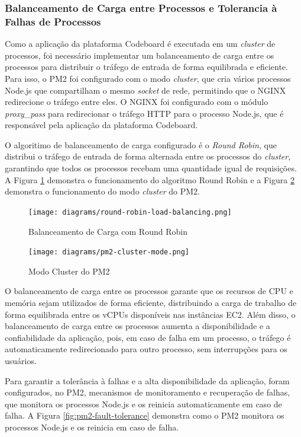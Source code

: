 \subsubsection{Balanceamento de Carga entre Processos e Tolerancia à Falhas de Processos}

Como a aplicação da plataforma Codeboard é executada em um \emph{cluster} de processos, foi necessário implementar um balanceamento de carga entre os processos para distribuir o tráfego de entrada de forma equilibrada e eficiente. Para isso, o PM2 foi configurado com o modo \emph{cluster}, que cria vários processos Node.js que compartilham o mesmo \emph{socket} de rede, permitindo que o NGINX redirecione o tráfego entre eles. O NGINX foi configurado com o módulo \emph{proxy\_pass} para redirecionar o tráfego HTTP para o processo Node.js, que é responsável pela aplicação da plataforma Codeboard. 

O algoritimo de balanceamento de carga configurado é o \emph{Round Robin}, que distribui o tráfego de entrada de forma alternada entre os processos do \emph{cluster}, garantindo que todos os processos recebam uma quantidade igual de requisições. A Figura \ref{fig:round-robin-load-balancing} demonstra o funcionamento do algoritmo Round Robin e a Figura \ref{fig:pm2-cluster-mode} demonstra o funcionamento do modo \emph{cluster} do PM2.

\begin{figure}[H]
    \centering
    \texttt{[image: diagrams/round-robin-load-balancing.png]}
    \caption{Balanceamento de Carga com Round Robin}
    \label{fig:round-robin-load-balancing}
\end{figure} 

\begin{figure}[H]
    \centering
    \texttt{[image: diagrams/pm2-cluster-mode.png]}
    \caption{Modo Cluster do PM2}
    \label{fig:pm2-cluster-mode}
\end{figure}

O balanceamento de carga entre os processos garante que os recursos de CPU e memória sejam utilizados de forma eficiente, distribuindo a carga de trabalho de forma equilibrada entre os vCPUs disponíveis nas instâncias EC2. Além disso, o balanceamento de carga entre os processos aumenta a disponibilidade e a confiabilidade da aplicação, pois, em caso de falha em um processo, o tráfego é automaticamente redirecionado para outro processo, sem interrupções para os usuários.

Para garantir a tolerância à falhas e a alta disponibilidade da aplicação, foram configurados, no PM2, mecanismos de monitoramento e recuperação de falhas, que monitora os processos Node.js e os reinicia automaticamente em caso de falha. A Figura \ref{fig:pm2-fault-tolerance} demonstra como o PM2 monitora os processos Node.js e os reinicia em caso de falha.

